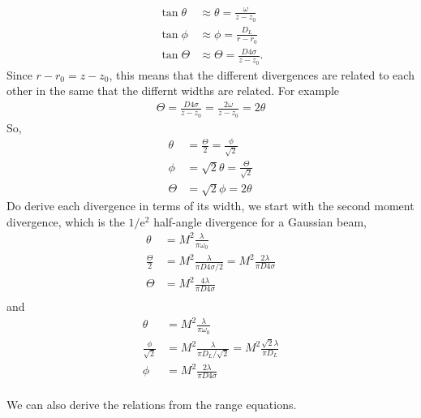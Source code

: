 \documentclass[]{article}
\begin{document}
\begin{align}
    \tan\theta &\approx \theta = \frac{\omega}{z-z_0} \\
    \tan\phi &\approx \phi = \frac{D_L}{r-r_0} \\
    \tan\Theta &\approx \Theta = \frac{D4\sigma}{z-z_0}.
\end{align}
Since $r-r_0 = z-z_0$, this means that the different divergences are related to each other in the same that the differnt widths are related. For example
\begin{align}
    \Theta = \frac{D4\sigma}{z-z_0} = \frac{2\omega}{z-z_0} = 2\theta
\end{align}
So,
\begin{align}
\theta &= \frac{\Theta}{2} = \frac{\phi}{\sqrt{2}} \\
\phi &= \sqrt{2}\theta = \frac{\Theta}{\sqrt{2}} \\
\Theta &= \sqrt{2} \phi = 2\theta
\end{align}
Do derive each divergence in terms of its width, we start with the second moment divergence, which is the $1/\text{e}^2$ half-angle divergence for a Gaussian beam,
\begin{align}
    \theta &= M^2 \frac{\lambda}{\pi \omega_0} \\
    \frac{\Theta}{2}&= M^2 \frac{\lambda}{\pi  D4\sigma/2} = M^2 \frac{2\lambda}{\pi D4\sigma} \\
    \Theta&= M^2 \frac{4\lambda}{\pi D4\sigma} \\
\end{align}
and
\begin{align}
    \theta &= M^2 \frac{\lambda}{\pi \omega_0} \\
    \frac{\phi}{\sqrt{2}} &= M^2 \frac{\lambda}{\pi  D_L/\sqrt{2}} = M^2 \frac{\sqrt{2}\lambda}{\pi D_L} \\
    \phi &= M^2 \frac{2\lambda}{\pi D4\sigma} \\
\end{align}

We can also derive the relations from the range equations.
\end{document}
